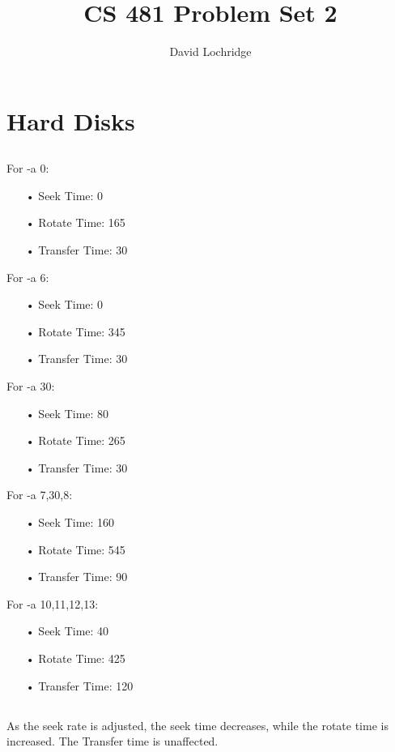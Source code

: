 \documentclass[]{scrartcl}
\title{CS 481 Problem Set 2}
\author{David Lochridge}
\begin{document}
\maketitle

\section{Hard Disks}
\subsection{}
For -a 0:
\begin{itemize}
\item[•] Seek Time: 0
\item[•] Rotate Time: 165
\item[•] Transfer Time: 30
\end{itemize}

For -a 6:
\begin{itemize}
\item[•] Seek Time: 0
\item[•] Rotate Time: 345
\item[•] Transfer Time: 30
\end{itemize}

For -a 30:
\begin{itemize}
\item[•] Seek Time: 80
\item[•] Rotate Time: 265
\item[•] Transfer Time: 30
\end{itemize}

For -a 7,30,8:
\begin{itemize}
\item[•] Seek Time: 160
\item[•] Rotate Time: 545
\item[•] Transfer Time: 90
\end{itemize}

For -a 10,11,12,13:
\begin{itemize}
\item[•] Seek Time: 40
\item[•] Rotate Time: 425
\item[•] Transfer Time: 120
\end{itemize}
\subsection{}
As the seek rate is adjusted, the seek time decreases, while the rotate time is increased. The Transfer time is unaffected.
\end{document}
